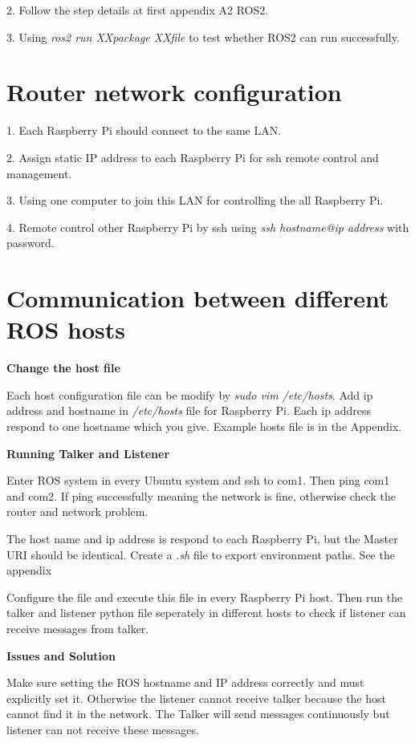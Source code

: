 \documentclass{mproj}
\begin{document}
2. Follow the step details at first appendix A2 ROS2. 

3. Using \textit{ros2 run XXpackage XXfile} to test whether ROS2 can run successfully.


\section{Router network configuration}
1. Each Raspberry Pi should connect to the same LAN.

2. Assign static IP address to each Raspberry Pi for ssh remote control and management.

3. Using one computer to join this LAN for controlling the all Raspberry Pi.

4. Remote control other Raspberry Pi by ssh using \textit{ssh {hostname}@{ip address}} with password.


\section{Communication between different ROS hosts}
\textbf{Change the host file} 

Each host configuration file can be modify by \textit{sudo vim /etc/hosts}. Add ip address and hostname in \textit{/etc/hosts} file for Raspberry Pi. Each ip address respond to one hostname which you give.
Example hosts file is in the Appendix.

\textbf{Running Talker and Listener}

Enter ROS system in every Ubuntu system and ssh to com1. Then ping com1 and com2. If ping successfully meaning the network is fine, otherwise check the router and network problem.

The host name and ip address is respond to each Raspberry Pi, but the Master URI should be identical. Create a  \textit{.sh} file to export environment paths. See the appendix

Configure the file and execute this file in every Raspberry Pi host. Then run the talker and listener python file seperately in different hosts to check if listener can receive messages from talker.

\textbf{Issues and Solution}

Make sure setting the ROS hostname and IP address correctly and must explicitly set it. Otherwise the listener cannot receive talker because the host cannot find it in the network. The Talker will send messages continuously but listener can not receive these messages.
\end{document}

